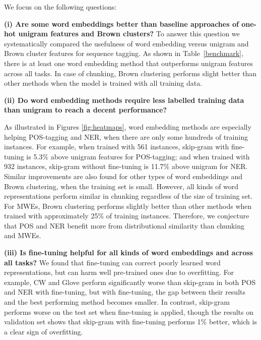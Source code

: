 We focus on the following questions:

\textbf{(i) Are some word embeddings better than baseline approaches of one-hot unigram features and Brown clusters?}
To answer this question we systematically compared the usefulness of word embedding versus
unigram and Brown cluster features for sequence tagging.
As shown in Table~\ref{benchmark}, there is at least one word embedding method that outperforms
unigram features across all tasks. In case of chunking, Brown clustering performs slight better than other methods when the model is trained with all training data. 

\textbf{(ii) Do word embedding methods require less labelled training data than unigram to reach a decent performance?}

As illustrated in Figures \ref{fig:heatmaps}, word embedding methods are especially helping POS-tagging and NER, when there are only some hundreds of training instances. 
For example, when trained with 561 instances, skip-gram with fine-tuning is 5.3\% above
unigram features for POS-tagging; and when trained with 932 instances, skip-gram without fine-tuning is 11.7\% above unigram for NER. Similar improvements are also found for other types of word embeddings and Brown clustering, when the training set is small. However, all kinds of word representations perform similar in chunking regardless of the size of training set. For MWEs, Brown clustering performs slightly better than other methods when trained with approximately 25\% of training instances. Therefore, we conjecture that POS and NER benefit more from distributional similarity than chunking and MWEs.

\textbf{(iii) Is fine-tuning helpful for all kinds of word embeddings and across all tasks?}
We found that fine-tuning can correct poorly learned word representations, but can harm well pre-trained ones due to overfitting. For example, CW and Glove perform significantly worse than skip-gram in both POS and NER with fine-tuning, but with fine-tuning, the gap between their results and the best performing method becomes smaller. In contrast, skip-gram performs worse on the test set when fine-tuning is applied, though the results on validation set shows that skip-gram with fine-tuning performs 1\% better, which is a clear sign of overfitting.

